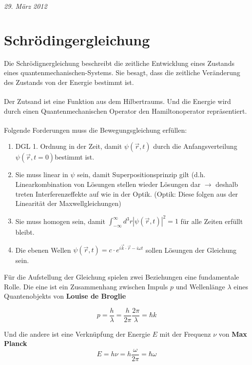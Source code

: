 




\textit{29. März 2012}


\section*{Schrödingergleichung}

Die Schrödignergleichung beschreibt die zeitliche Entwicklung eines Zustands eines quantenmechanischen-Systems. Sie besagt, dass die zeitliche Veränderung des Zustands von der Energie bestimmt ist.\\
\\
Der Zutsand ist eine Funktion aus dem Hilbertraums. Und die Energie wird durch einen Quantenmechanischen Operator den Hamiltonoperator repräsentiert.\\
\\
Folgende Forderungen muss die Bewegungsgleichung erfüllen:
\begin{enumerate}
\item DGL 1. Ordnung in der Zeit, damit $\psi(\vec{r},t)$ durch die Anfangsverteilung
  $\psi(\vec{r},t=0)$bestimmt ist.
\item Sie muss linear in $\psi$ sein, damit Superpositionsprinzip gilt (d.h.
  Linearkombination von Lösungen stellen wieder Lösungen dar $\rightarrow$ deshalb
  treten Interferenzeffekte auf wie in der Optik. (Optik: Diese folgen
  aus der Linearität der Maxwellgleichungen)
\item Sie muss homogen sein, damit
  $\int_{-\infty}^{\infty}d^{3}r|\psi(\vec{r},t)|^{2}=1$ für
  alle Zeiten erfüllt bleibt.
\item Die ebenen Wellen \(\psi(\vec{r},t)=c\cdot  e^{i\vec{k}\cdot\vec{r}-i\omega t}\) sollen  Lösungen der Gleichung sein. 
\end{enumerate}

Für die Aufstellung der Gleichung spielen zwei Beziehungen eine fundamentale Rolle. Die eine ist ein Zusammenhang zwischen Impuls \(p\) und Wellenlänge \(\lambda\) eines Quantenobjekts von \textbf{Louise de Broglie}

\begin{equation}
  \label{eq:3}
  p = \frac{h}{\lambda} = \frac{h}{2\pi}\frac{2\pi}{\lambda} = \hbar k
\end{equation}

Und die andere ist eine Verknüpfung der Energie \(E\) mit der Frequenz \(\nu\) von \textbf{Max Planck}
\begin{equation}
  \label{eq:2}
  E=h\nu=h\frac{\omega}{2\pi} =\hbar \omega
\end{equation}

